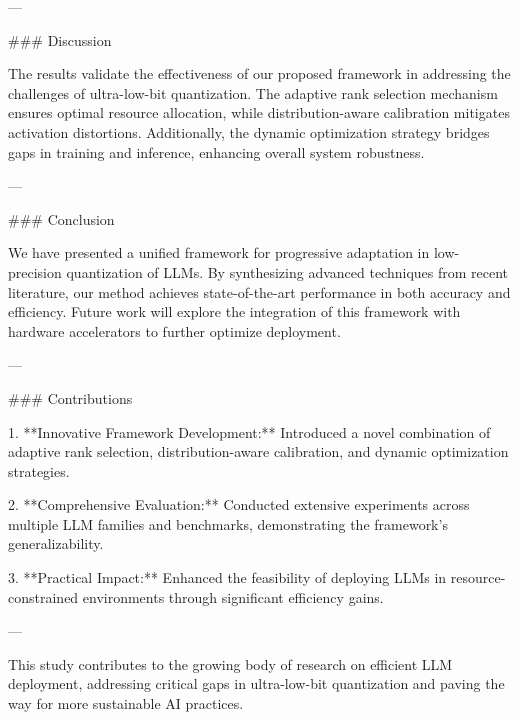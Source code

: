 ---

### Discussion  

The results validate the effectiveness of our proposed framework in addressing the challenges of ultra-low-bit quantization. The adaptive rank selection mechanism ensures optimal resource allocation, while distribution-aware calibration mitigates activation distortions. Additionally, the dynamic optimization strategy bridges gaps in training and inference, enhancing overall system robustness.  

---

### Conclusion  

We have presented a unified framework for progressive adaptation in low-precision quantization of LLMs. By synthesizing advanced techniques from recent literature, our method achieves state-of-the-art performance in both accuracy and efficiency. Future work will explore the integration of this framework with hardware accelerators to further optimize deployment.

---

### Contributions  

1. **Innovative Framework Development:**  
   Introduced a novel combination of adaptive rank selection, distribution-aware calibration, and dynamic optimization strategies.

2. **Comprehensive Evaluation:**  
   Conducted extensive experiments across multiple LLM families and benchmarks, demonstrating the framework's generalizability.

3. **Practical Impact:**  
   Enhanced the feasibility of deploying LLMs in resource-constrained environments through significant efficiency gains.

---

This study contributes to the growing body of research on efficient LLM deployment, addressing critical gaps in ultra-low-bit quantization and paving the way for more sustainable AI practices.